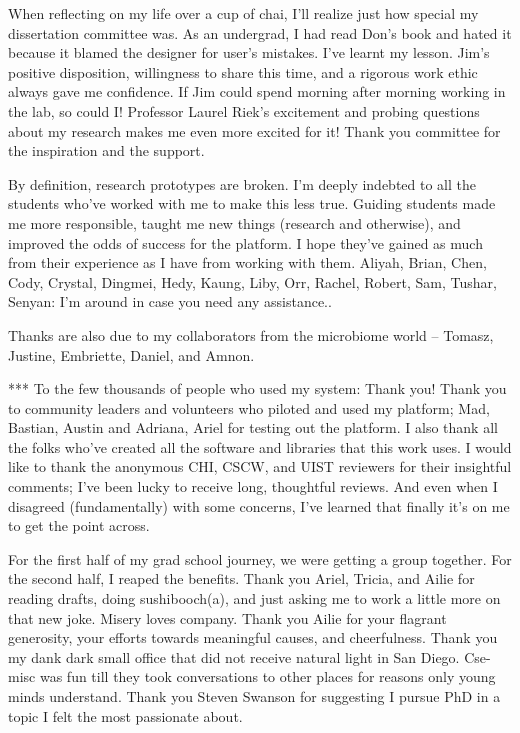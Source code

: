 \begin{frontmatter}
\begin{acknowledgements}
When reflecting on my life over a cup of chai, I’ll realize just how special my dissertation committee was. As an undergrad, I had read Don’s book and hated it because it blamed the designer for user’s mistakes. I’ve learnt my lesson. Jim’s positive disposition, willingness to share this time, and a rigorous work ethic always gave me confidence. If Jim could spend morning after morning working in the lab, so could I! Professor Laurel Riek’s excitement and probing questions about my research makes me even more excited for it! Thank you committee for the inspiration and the support. 

By definition, research prototypes are broken. I’m deeply indebted to all the students who’ve worked with me to make this less true. Guiding students made me more responsible, taught me new things (research and otherwise), and improved the odds of success for the platform. I hope they’ve gained as much from their experience as I have from working with them. Aliyah, Brian, Chen, Cody, Crystal, Dingmei, Hedy, Kaung, Liby, Orr, Rachel, Robert, Sam, Tushar, Senyan: I’m around in case you need any assistance.. 

Thanks are also due to my collaborators from the microbiome world -- Tomasz, Justine, Embriette, Daniel, and Amnon. 

***
To the few thousands of people who used my system: Thank you!  Thank you to community leaders and volunteers who piloted and used my platform; Mad, Bastian, Austin and Adriana, Ariel for testing out the platform. I also thank all the folks who’ve created all the software and libraries that this work uses. I would like to thank the anonymous CHI, CSCW, and UIST reviewers for their insightful comments; I’ve been lucky to receive long, thoughtful reviews. And even when I disagreed (fundamentally) with some concerns, I’ve learned that finally it’s on me to get the point across.

For the first half of my grad school journey, we were getting a group together. For the second half, I reaped the benefits. Thank you Ariel, Tricia, and Ailie for reading drafts, doing sushibooch(a), and just asking me to work a little more on that new joke. Misery loves company. Thank you Ailie for your flagrant generosity, your efforts towards meaningful causes, and cheerfulness. Thank you my dank dark small office that did not receive natural light in San Diego. Cse-misc was fun till they took conversations to other places for reasons only young minds understand. Thank you Steven Swanson for suggesting I pursue PhD in a topic I felt the most passionate about.


\end{acknowledgements}
\end{frontmatter}
